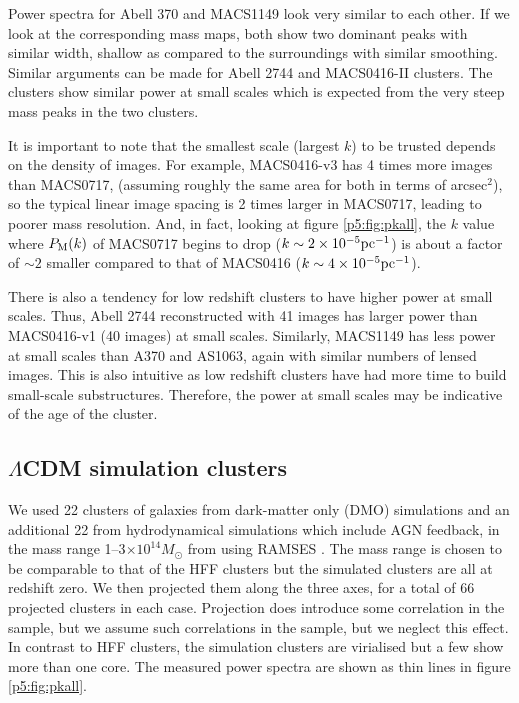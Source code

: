 \documentclass[
  11pt,
  twoside,
  openright,
  titlepage,
  headings=optiontoheadandtoc
]{scrbook}
\begin{document}
Power spectra for Abell 370 and MACS1149 look very similar to each other. If we look at the corresponding mass maps, both show two dominant peaks with similar width, shallow as compared to the surroundings with similar smoothing.
Similar arguments can be made for Abell 2744 and MACS0416-II clusters.
The clusters show similar power at small scales which is expected from the very steep mass peaks in the two clusters.

It is important to note that the smallest scale (largest $k$) to be trusted depends on the density
of images. For example, MACS0416-v3 has 4 times more images than MACS0717, (assuming
roughly the same area for both in terms of arcsec$^2$), so the typical linear image
spacing is 2 times larger in MACS0717, leading to poorer mass
resolution. And, in fact,
looking at figure \ref{p5:fig:pkall}, the $k$ value where $P_{\rm M}(k)$  of MACS0717 begins to drop
($k\sim 2\times 10^{-5} {\rm pc}^{-1}$) is about a
factor of $\sim 2$ smaller compared to that of MACS0416
($k\sim 4\times 10^{-5} {\rm pc}^{-1}$).

There is also a tendency for low redshift clusters to have higher power at
small scales. Thus, Abell 2744 reconstructed with 41 images has larger power
than MACS0416-v1 (40 images) at small scales.
Similarly, MACS1149 has less power at small scales than A370 and AS1063, again with similar numbers of lensed images.
This is also intuitive as low redshift clusters have had more time to
build small-scale substructures.
Therefore, the power at small scales may be indicative of the age of the cluster.

\subsection{\texorpdfstring{$\Lambda$CDM}{Lambda-CDM} simulation clusters}

We used 22 clusters of galaxies from dark-matter only (DMO) simulations and
an additional 22 from hydrodynamical simulations which include AGN feedback,
in the mass range  1--3$\times 10^{14} M_{\odot}$ from \cite{2014MNRAS.440.2290M}
using RAMSES \citep{2002A&A...385..337T}.
The mass range is chosen to be comparable to that of the HFF clusters but the
simulated clusters are all at redshift zero. We then projected
them along the three axes, for a total of 66 projected clusters in each case.
Projection does introduce some correlation in the sample, but we assume
such correlations in the sample, but we neglect this effect.
In contrast to HFF clusters, the simulation clusters are virialised but a few show more than one core.
The measured power spectra are shown as thin lines in figure \ref{p5:fig:pkall}.
\end{document}
